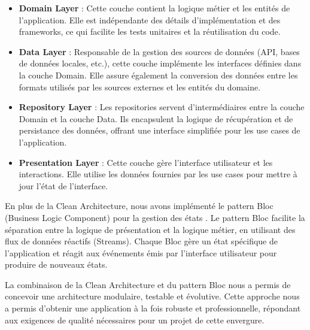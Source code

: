 \begin{itemize}[noitemsep]
    \item \textbf{Domain Layer} : Cette couche contient la logique métier et les entités de l'application. Elle est indépendante des détails d'implémentation et des frameworks, ce qui facilite les tests unitaires et la réutilisation du code.
    \item \textbf{Data Layer} : Responsable de la gestion des sources de données (API, bases de données locales, etc.), cette couche implémente les interfaces définies dans la couche Domain. Elle assure également la conversion des données entre les formats utilisés par les sources externes et les entités du domaine.
    \item \textbf{Repository Layer} : Les repositories servent d'intermédiaires entre la couche Domain et la couche Data. Ils encapsulent la logique de récupération et de persistance des données, offrant une interface simplifiée pour les use cases de l'application.
    \item \textbf{Presentation Layer} : Cette couche gère l'interface utilisateur et les interactions. Elle utilise les données fournies par les use cases pour mettre à jour l'état de l'interface.
\end{itemize}

En plus de la Clean Architecture, nous avons implémenté le pattern Bloc (Business Logic Component) pour la gestion des états \cite{blocPattern}. Le pattern Bloc facilite la séparation entre la logique de présentation et la logique métier, en utilisant des flux de données réactifs (Streams). Chaque Bloc gère un état spécifique de l'application et réagit aux événements émis par l'interface utilisateur pour produire de nouveaux états.

La combinaison de la Clean Architecture et du pattern Bloc nous a permis de concevoir une architecture modulaire, testable et évolutive. Cette approche nous a permis d'obtenir une application à la fois robuste et professionnelle, répondant aux exigences de qualité nécessaires pour un projet de cette envergure.


